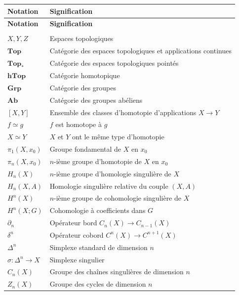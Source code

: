 \documentclass[12pt,a4paper,openany]{book}
\theoremstyle{definition}
\theoremstyle{plain}
\theoremstyle{remark}
\begin{document}
\begin{longtable}{>{\raggedright}p{4.5cm} p{9cm}}
\toprule
\textbf{Notation} & \textbf{Signification} \\
\midrule
\endfirsthead
\toprule
\textbf{Notation} & \textbf{Signification} \\
\midrule
\endhead
\midrule
\multicolumn{2}{r}{\emph{Suite page suivante}} \\
\bottomrule
\endfoot
\bottomrule
\endlastfoot
$X, Y, Z$ & Espaces topologiques \\
$\mathbf{Top}$ & Catégorie des espaces topologiques et applications continues \\
$\mathbf{Top}_*$ & Catégorie des espaces topologiques pointés \\
$\mathbf{hTop}$ & Catégorie homotopique \\
$\mathbf{Grp}$ & Catégorie des groupes \\
$\mathbf{Ab}$ & Catégorie des groupes abéliens \\
$[X,Y]$ & Ensemble des classes d'homotopie d'applications $X \to Y$ \\
$f \simeq g$ & $f$ est homotope à $g$ \\
$X \simeq Y$ & $X$ et $Y$ ont le même type d'homotopie \\
$\pi_1(X, x_0)$ & Groupe fondamental\index{groupe fondamental} de $X$ en $x_0$ \\
$\pi_n(X, x_0)$ & $n$-ième groupe d'homotopie de $X$ en $x_0$ \\
$H_n(X)$ & $n$-ième groupe d'homologie singulière\index{homologie singulière} de $X$ \\
$H_n(X, A)$ & Homologie singulière relative du couple $(X, A)$ \\
$H^n(X)$ & $n$-ième groupe de cohomologie singulière\index{cohomologie singulière} de $X$ \\
$H^n(X; G)$ & Cohomologie à coefficients dans $G$ \\
$\partial_n$ & Opérateur bord\index{opérateur bord} $C_n(X) \to C_{n-1}(X)$ \\
$\delta^n$ & Opérateur cobord $C^n(X) \to C^{n+1}(X)$ \\
$\Delta^n$ & Simplexe standard\index{simplexe standard} de dimension $n$ \\
$\sigma : \Delta^n \to X$ & Simplexe singulier\index{simplexe singulier} \\
$C_n(X)$ & Groupe des chaînes singulières de dimension $n$ \\
$Z_n(X)$ & Groupe des cycles de dimension $n$ \\

\end{longtable}
\end{document}
